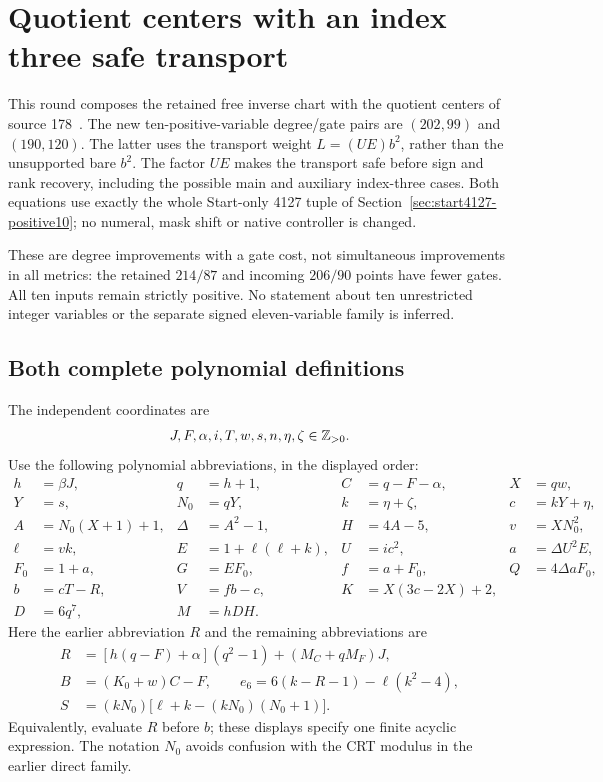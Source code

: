 \section{Quotient centers with an index three safe transport}
\label{sec:scalar23}
This round composes the retained free inverse chart with the quotient centers
of source 178~\cite{centers178}. The new ten-positive-variable degree/gate pairs are
$(202,99)$ and $(190,120)$. The latter uses the transport weight
$L=(UE)b^2$, rather than the unsupported bare $b^2$. The factor $UE$ makes
the transport safe before sign and rank recovery, including the possible
main and auxiliary index-three cases. Both equations use exactly the whole
Start-only 4127 tuple of Section~\ref{sec:start4127-positive10}; no numeral,
mask shift or native controller is changed.

These are degree improvements with a gate cost, not simultaneous improvements
in all metrics: the retained $214/87$ and incoming $206/90$ points have fewer
gates. All ten inputs remain strictly positive. No statement about ten
unrestricted integer variables or the separate signed eleven-variable family
is inferred.

\subsection{Both complete polynomial definitions}
The independent coordinates are
\[
 J,F,\alpha,i,T,w,s,n,\eta,\zeta\in\mathbb Z_{>0}.
\]
Use the following polynomial abbreviations, in the displayed order:
\begin{align*}
 h&=\beta J,&q&=h+1,&C&=q-F-\alpha,&X&=qw,\\
 Y&=s,&N_0&=qY,&k&=\eta+\zeta,&c&=kY+\eta,\\
 A&=N_0(X+1)+1,&\Delta&=A^2-1,&H&=4A-5,&v&=XN_0^2,\\
 \ell&=vk,&E&=1+\ell(\ell+k),&U&=ic^2,&a&=\Delta U^2E,\\
 F_0&=1+a,&G&=EF_0,&f&=a+F_0,&Q&=4\Delta aF_0,\\
 b&=cT-R,&V&=fb-c,&K&=X(3c-2X)+2,\\
 D&=6q^7,&M&=hDH.&&
\end{align*}
Here the earlier abbreviation $R$ and the remaining abbreviations are
\begin{align*}
 R&=[h(q-F)+\alpha](q^2-1)+(M_C+qM_F)J,\\
 B&=(K_0+w)C-F,\qquad
 e_6=6(k-R-1)-\ell(k^2-4),\\
 S&=(kN_0)\bigl[\ell+k-(kN_0)(N_0+1)\bigr].
\end{align*}
Equivalently, evaluate $R$ before $b$; these displays specify one finite
acyclic expression. The notation $N_0$ avoids confusion with the CRT modulus
in the earlier direct family.

